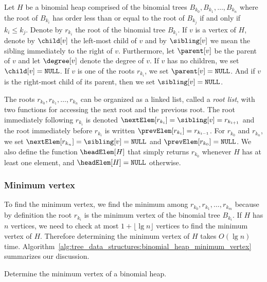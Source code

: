 Let $H$ be a binomial heap comprised of the binomial trees
$B_{k_0}, B_{k_1}, \dots, B_{k_n}$ where the root of $B_{k_i}$ has
order less than or equal to the root of $B_{k_j}$ if and only if
$k_i \leq k_j$. Denote by $r_{k_i}$ the root of the binomial tree
$B_{k_i}$. If $v$ is a vertex of $H$, denote by $\child[v]$ the
left-most child of $v$ and by $\sibling[v]$ we mean the sibling
immediately to the right of $v$. Furthermore, let $\parent[v]$ be the
parent of $v$ and let $\degree[v]$ denote the degree of $v$. If $v$
has no children, we set $\child[v] = \texttt{NULL}$. If $v$ is one of
the roots $r_{k_i}$, we set $\parent[v] = \texttt{NULL}$. And if $v$
is the right-most child of its parent, then we set
$\sibling[v] = \texttt{NULL}$.

The roots $r_{k_0}, r_{k_1}, \dots, r_{k_n}$ can be organized as a
linked list, called a \emph{root list}, with two
functions for accessing the next root and the previous root. The root
immediately following $r_{k_i}$ is denoted
$\nextElem[r_{k_i}] = \sibling[v] = r_{k_{i+1}}$ and the root
immediately before $r_{k_i}$ is written
$\prevElem[r_{k_i}] = r_{k_{i-1}}$. For $r_{k_0}$ and $r_{k_n}$, we
set $\nextElem[r_{k_n}] = \sibling[v] = \texttt{NULL}$ and
$\prevElem[r_{k_0}] = \texttt{NULL}$. We also define the function
$\headElem[H]$ that simply returns $r_{k_0}$ whenever $H$ has at least
one element, and $\headElem[H] = \texttt{NULL}$ otherwise.



\subsubsection{Minimum vertex}

To find the minimum vertex, we find the minimum among
$r_{k_0}, r_{k_1}, \dots, r_{k_m}$ because by definition the root
$r_{k_i}$ is the minimum vertex of the binomial tree $B_{k_i}$. If $H$
has $n$ vertices, we need to check at most $1 + \lfloor \lg n \rfloor$
vertices to find the minimum vertex of $H$. Therefore determining the
minimum vertex of $H$ takes $O(\lg n)$ time.
Algorithm~\ref{alg:tree_data_structures:binomial_heap_minimum_vertex}
summarizes our discussion.

\begin{algorithm}[!htbp]

\caption{Determine the minimum vertex of a binomial heap.}
\label{alg:tree_data_structures:binomial_heap_minimum_vertex}
\end{algorithm}


